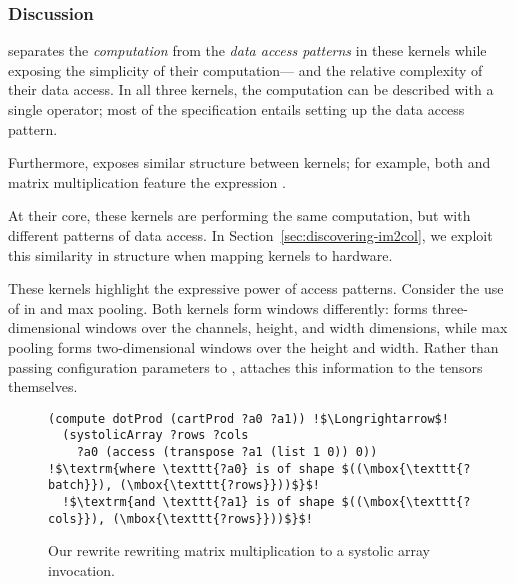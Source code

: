   
\subsubsection*{Discussion}\label{section:kernel-implementation-discussion}

\g separates
  the \textit{computation}
  from the \textit{data access patterns}
  in these kernels while exposing
  the simplicity of their computation---%
  and the relative complexity
  of their data access.
In all three kernels,
  the computation can be described
  with a single operator;
  most of the specification
  entails
  setting up the data access pattern.

Furthermore,
  \g exposes similar structure
  between kernels;
  for example,
  both \ctd
  and matrix multiplication
  feature the expression
  .
  
At their core, these kernels
  are performing the same computation,
  but with different patterns
  of data access.
In Section~\ref{sec:discovering-im2col},
  we exploit this similarity in structure
  when mapping kernels to hardware.
  
These kernels highlight the expressive power
  of access patterns.
Consider the use of 
  in \ctd
   and max pooling.
Both kernels
  form windows
  differently:
  \ctd forms three-dimensional
  windows
  over the channels, height, and width
  dimensions,
  while max pooling forms two-dimensional windows
  over the height and width.
Rather than passing configuration parameters to ,
  \g attaches this information to the tensors themselves.
  
  
\begin{figure}
\begin{lstlisting}[escapechar=!]
(compute dotProd (cartProd ?a0 ?a1)) !$\Longrightarrow$!
  (systolicArray ?rows ?cols
    ?a0 (access (transpose ?a1 (list 1 0)) 0))
!$\textrm{where \texttt{?a0} is of shape $((\mbox{\texttt{?batch}}), (\mbox{\texttt{?rows}}))$}$!
  !$\textrm{and \texttt{?a1} is of shape $((\mbox{\texttt{?cols}}), (\mbox{\texttt{?rows}}))$}$!
\end{lstlisting}
\caption{Our rewrite rewriting matrix multiplication to a systolic array invocation.}
    \label{fig:systolic-array-rewrite}
\end{figure}
  
